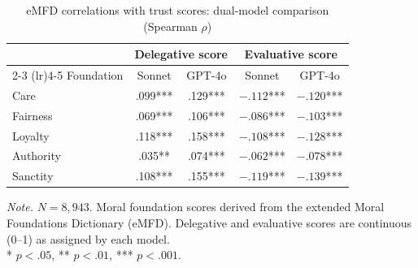 \begin{table}[htbp]
\centering
\small
\caption{eMFD correlations with trust scores: dual-model comparison (Spearman $\rho$)}
\label{tab:cfpb_emfd}
\begin{tabular}{lcccc}
\toprule
 & \multicolumn{2}{c}{Delegative score} & \multicolumn{2}{c}{Evaluative score} \\
\cmidrule(lr){2-3} \cmidrule(lr){4-5}
Foundation & Sonnet & GPT-4o & Sonnet & GPT-4o \\
\midrule
Care      & .099*** & .129*** & $-.112$*** & $-.120$*** \\
Fairness  & .069*** & .106*** & $-.086$*** & $-.103$*** \\
Loyalty   & .118*** & .158*** & $-.108$*** & $-.128$*** \\
Authority & .035**  & .074*** & $-.062$*** & $-.078$*** \\
Sanctity  & .108*** & .155*** & $-.119$*** & $-.139$*** \\
\bottomrule
\end{tabular}
\begin{flushleft}
\footnotesize
\textit{Note.} $N = 8{,}943$. Moral foundation scores derived from the extended Moral Foundations Dictionary (eMFD). Delegative and evaluative scores are continuous (0--1) as assigned by each model. \\
* $p < .05$, ** $p < .01$, *** $p < .001$.
\end{flushleft}
\end{table}
